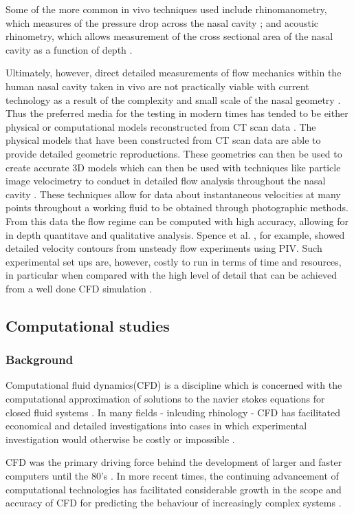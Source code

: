 Some of the more common in vivo techniques used include rhinomanometry, which measures of the pressure drop across the nasal cavity \cite{Hilberg1989}; and acoustic rhinometry, which allows measurement of the cross sectional area of the nasal cavity as a function of depth \cite{Hilberg1989}. 

Ultimately, however, direct detailed measurements of flow mechanics within the human nasal cavity taken in vivo are not practically viable with current technology as a result of the complexity and small scale of the nasal geometry \cite{Doorly2008c}. Thus the preferred media for the testing in modern times has tended to be either physical or computational models reconstructed from CT scan data \cite{Doorly2008c}. The physical models that have been constructed from CT scan data are able to provide detailed geometric reproductions.
These geometries can then be used to create accurate 3D models which can then be used with techniques like particle image velocimetry to conduct in detailed flow analysis throughout the nasal cavity \cite{Chung2008, Kelly2000}.
These techniques allow for data about instantaneous velocities at many points throughout a working fluid to be obtained through photographic methods. From this data the flow regime can be computed with high accuracy, allowing for in depth quantitave and qualitative analysis. Spence et al. \cite{Spence2012}, for example, showed detailed velocity contours from unsteady flow experiments using PIV.
Such experimental set ups are, however, costly to run in terms of time and resources, in particular when compared with the high level of detail that can be achieved from a well done CFD simulation \cite{Ma2009}.


\subsection{Computational studies}  
\subsubsection*{Background}
Computational fluid dynamics(CFD) is a discipline which is concerned with the computational approximation of solutions to the navier stokes equations for closed fluid systems \cite{Tu2008}. In many fields - inlcuding rhinology - CFD has facilitated economical and detailed investigations into cases in which experimental investigation would otherwise be costly or impossible \cite{Keyhani1995}.

CFD was the primary driving force behind the development of larger and faster computers until the 80's \cite{Wendt2009}. In more recent times, the continuing advancement of computational technologies has facilitated considerable growth in the scope and accuracy of CFD for predicting the behaviour of increasingly complex systems \cite{Tu2008}. 


